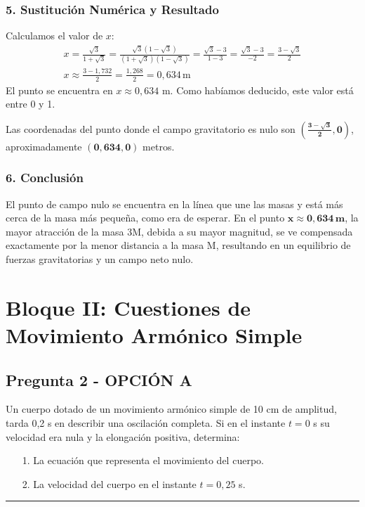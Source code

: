 \subsubsection*{5. Sustitución Numérica y Resultado}
Calculamos el valor de $x$:
\begin{gather}
    x = \frac{\sqrt{3}}{1+\sqrt{3}} = \frac{\sqrt{3}(1-\sqrt{3})}{(1+\sqrt{3})(1-\sqrt{3})} = \frac{\sqrt{3}-3}{1-3} = \frac{\sqrt{3}-3}{-2} = \frac{3-\sqrt{3}}{2} \\
    x \approx \frac{3 - 1,732}{2} = \frac{1,268}{2} = 0,634 \, \text{m}
\end{gather}
El punto se encuentra en $x \approx 0,634$ m. Como habíamos deducido, este valor está entre 0 y 1.
\begin{cajaresultado}
Las coordenadas del punto donde el campo gravitatorio es nulo son $\boldsymbol{(\frac{3-\sqrt{3}}{2}, 0)}$, aproximadamente $\boldsymbol{(0,634, 0)}$ metros.
\end{cajaresultado}

\subsubsection*{6. Conclusión}
\begin{cajaconclusion}
El punto de campo nulo se encuentra en la línea que une las masas y está más cerca de la masa más pequeña, como era de esperar. En el punto $\mathbf{x \approx 0,634 \, m}$, la mayor atracción de la masa 3M, debida a su mayor magnitud, se ve compensada exactamente por la menor distancia a la masa M, resultando en un equilibrio de fuerzas gravitatorias y un campo neto nulo.
\end{cajaconclusion}

\newpage

\section{Bloque II: Cuestiones de Movimiento Armónico Simple}
\label{sec:mas_2003_jun_ord}

\subsection{Pregunta 2 - OPCIÓN A}
\label{subsec:2A_2003_jun_ord}

\begin{cajaenunciado}
Un cuerpo dotado de un movimiento armónico simple de 10 cm de amplitud, tarda 0,2 s en describir una oscilación completa. Si en el instante $t=0$ s su velocidad era nula y la elongación positiva, determina:
\begin{enumerate}
    \item[1.] La ecuación que representa el movimiento del cuerpo.
    \item[2.] La velocidad del cuerpo en el instante $t=0,25$ s.
\end{enumerate}
\end{cajaenunciado}
\hrule

